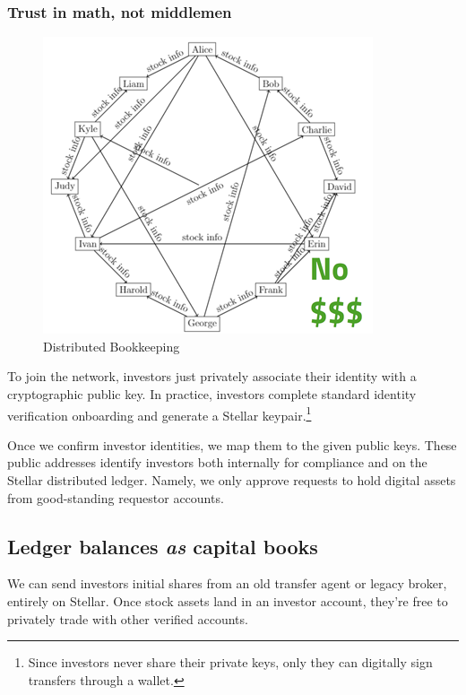 \documentclass[11pt, english]{article}
\begin{document}
\begin{multicols}{2}
\subsubsection{Trust in math, not middlemen}

\begin{figure}[H]
    \centering
    \includegraphics[width=\linewidth]{imgs/decentralized.png}
    \caption{Distributed Bookkeeping}
    \label{fig:decentralized}
\end{figure}

To join the network, investors just privately associate their identity with a cryptographic public key. In practice, investors complete standard identity verification onboarding and generate a Stellar keypair.\footnote{Since investors never share their private keys, only they can digitally sign transfers through a wallet.}

Once we confirm investor identities, we map them to the given public keys. These public addresses identify investors both internally for compliance and on the Stellar distributed ledger. Namely, we only approve requests to hold digital assets from good-standing requestor accounts.

\subsection{Ledger balances \textit{as} capital books}

We can send investors initial shares from an old transfer agent or legacy broker, entirely on Stellar. Once stock assets land in an investor account, they're free to privately trade with other verified accounts.


\end{multicols}
\end{document}

